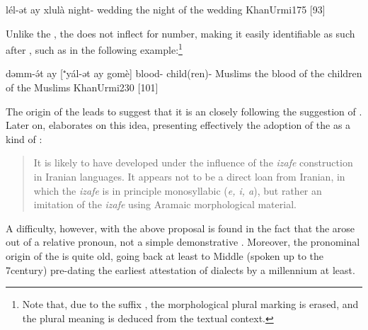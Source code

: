 {
{lél-ət ay\cb{} xlulà}
{night-\cst{} \lnk\cb{} wedding}
{the night of the wedding}
{KhanUrmi}{175 {[93]}}


Unlike the \dem*, the \lnk* {} does not inflect for number, making it easily identifiable as such after \pl* \prims, such as  in the following example:\footnote{Note that, due to the \cst* suffix \ed, the morphological plural marking is erased, and the plural meaning is deduced from the textual context.}


{dəmm-ə́t ay\cb{} [⁺yál-ət ay gomè]}
{blood-\cst{} \lnk\cb{} child(ren)-\cst{} \lnk{} Muslims}
{the blood of the children of the Muslims}
{KhanUrmi}{230 {[101]}}



The \dem* origin of the \lnk* leads \citet[8]{KhanUrmi} to suggest that it is an  closely following the suggestion of \citet[171, \S 2.32.12]{Garbell1965impact}. Later on, \citet[176]{KhanUrmi} elaborates on this idea, presenting effectively the adoption of the \lnk* as a kind of : \blockquote{It is likely to have developed under the influence of the \textit{izafe} construction in Iranian languages. It appears not to be a direct loan from Iranian, in which the \textit{izafe} is in principle monosyllabic (\textit{e, i, a}), but rather an imitation of the \textit{izafe} using Aramaic morphological material.} 










A difficulty, however, with the above proposal is found in the fact that the \ez* arose out of a relative pronoun, not a simple demonstrative \citep{HaiderZwanziger}. Moreover, the pronominal origin of the \ez* is quite old, going back at least to Middle  (spoken up to the 7\th century) pre-dating the earliest attestation of  dialects by a millennium at least. 

}
